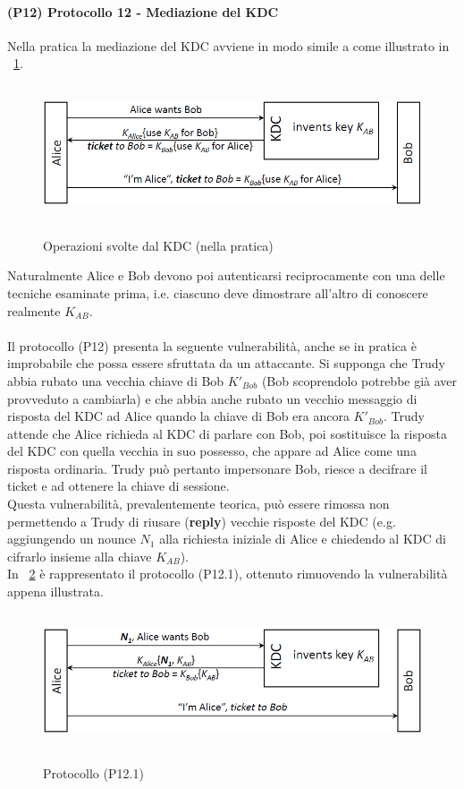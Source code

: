 \paragraph{(P12) Protocollo 12 - Mediazione del KDC}
Nella pratica la mediazione del KDC avviene in modo simile a come illustrato in \figurename~\ref{fig:ImgS97bis}.
\begin{figure}[htbp]
	\centering%
	\subfigure%
	{\includegraphics[height=4cm, width=12cm, keepaspectratio]{Immagini/autenticazione/ImgS97bis.png}}
	\caption{Operazioni svolte dal KDC (nella pratica)}\label{fig:ImgS97bis} 	
\end{figure}
Naturalmente Alice e Bob devono poi autenticarsi reciprocamente con una delle tecniche esaminate prima, i.e. ciascuno deve dimostrare all'altro di conoscere realmente $K_{AB}$.\\ \\
Il protocollo (P12) presenta la seguente vulnerabilità, anche se in pratica è improbabile che possa essere sfruttata da un attaccante. Si supponga che Trudy abbia rubato una vecchia chiave di Bob $K'_{Bob}$ (Bob scoprendolo potrebbe già aver provveduto a cambiarla) e che abbia anche rubato un vecchio messaggio di risposta del KDC ad Alice quando la chiave di Bob era ancora $K'_{Bob}$. Trudy attende che Alice richieda al KDC di parlare con Bob, poi sostituisce la risposta del KDC con quella vecchia in suo possesso, che appare ad Alice come una risposta ordinaria. Trudy può pertanto impersonare Bob, riesce a decifrare il ticket e ad ottenere la chiave di sessione.\\
Questa vulnerabilità, prevalentemente teorica, può essere rimossa non permettendo a Trudy di riusare (\textbf{reply}) vecchie risposte del KDC (e.g. aggiungendo un nounce $N_{1}$ alla richiesta iniziale di Alice e chiedendo al KDC di cifrarlo insieme alla chiave $K_{AB}$).\\
In \figurename~\ref{fig:ImgS103bis} è rappresentato il protocollo (P12.1), ottenuto rimuovendo la vulnerabilità appena illustrata.
\begin{figure}[htbp]
	\centering%
	\subfigure%
	{\includegraphics[height=4cm, width=12cm, keepaspectratio]{Immagini/autenticazione/ImgS103bis.png}}
	\caption{Protocollo (P12.1)}\label{fig:ImgS103bis} 	
\end{figure}

